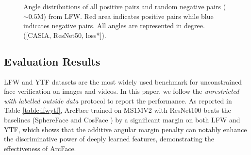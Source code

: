 \documentclass[10pt,twocolumn,letterpaper]{article}
\begin{document}
\begin{figure}[h!]
\centering
{}
\caption{Angle distributions of all positive pairs and random negative pairs ($\sim0.5$M) from LFW. Red area indicates positive pairs while blue indicates negative pairs. All angles are represented in degree. ([CASIA, ResNet50, loss*]).}
\vspace{-2mm}
\label{fig:losshist}
\end{figure}


\subsection{Evaluation Results}

LFW \cite{huang2007labeled} and YTF \cite{wolf2011face} datasets are the most widely used benchmark for unconstrained face verification on images and videos. In this paper, we follow the \textit{unrestricted with labelled outside data} protocol to report the performance. As reported in Table \ref{table:lfwytf}, ArcFace trained on MS1MV2 with ResNet100 beats the baselines (\eg SphereFace \cite{liu2017sphereface} and CosFace \cite{tencent2017CosineFace}) by a significant margin on both LFW and YTF, which shows that the additive angular margin penalty can notably enhance the discriminative power of deeply learned features, demonstrating the effectiveness of ArcFace.
\end{document}
